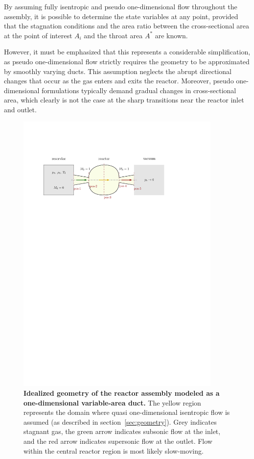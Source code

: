 By assuming fully isentropic and pseudo one-dimensional flow throughout the assembly, it is possible to determine the state variables at any point, provided that the stagnation conditions and the area ratio between the cross-sectional area at the point of interest $A_i$ and the throat area $A^*$ are known.

However, it must be emphasized that this represents a considerable simplification, as pseudo one-dimensional flow strictly requires the geometry to be approximated by smoothly varying ducts.
This assumption neglects the abrupt directional changes that occur as the gas enters and exits the reactor.
Moreover, pseudo one-dimensional formulations typically demand gradual changes in cross-sectional area, which clearly is not the case at the sharp transitions near the reactor inlet and outlet.
\cite{anderson2021modern}

\begin{figure}[H]
    \centering
    \includegraphics[width=0.9\textwidth]{src/03_analytical-work/fig_1d-flow-geometry}
    \caption[Idealized geometry of the reactor assembly modeled as a one-dimensional variable-area duct.]{
        \textbf{Idealized geometry of the reactor assembly modeled as a one-dimensional variable-area duct.}
        The yellow region represents the domain where quasi one-dimensional isentropic flow is assumed (as described in section~\ref{sec:geometry}).
        Grey indicates stagnant gas, the green arrow indicates subsonic flow at the inlet, and the red arrow indicates supersonic flow at the outlet.
        Flow within the central reactor region is most likely slow-moving.
    }
	\label{fig:one-dim-flow-geometry}
\end{figure}


